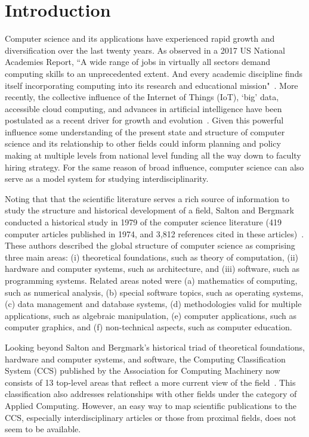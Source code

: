 \section{Introduction}
\label{intro}

Computer science and its applications have experienced rapid growth and diversification over the last twenty years. As observed in a 2017 US National Academies Report, ``A wide range of jobs in virtually all sectors demand computing skills to an unprecedented extent. And every academic discipline finds itself incorporating computing into its research and educational mission"~\cite{nas_2017}. More recently, the collective influence of the Internet of Things (IoT), `big' data, accessible cloud computing, and advances in artificial intelligence have been postulated as a recent driver for growth and evolution~\cite{siebel2019_digital}. Given this powerful influence some understanding of the present state and structure of computer science and its relationship to other fields could inform planning and policy making at multiple levels from national level funding all the way down to faculty hiring strategy. For the same reason of broad influence, computer science can also serve as a model system for studying interdisciplinarity. 

Noting that that the scientific literature serves a rich source of information to study the structure and historical development of a field, 
Salton and Bergmark conducted a historical study  in 1979 of the computer science literature (419 computer articles published in 1974,  and 3,812 references cited in these articles)~\cite{salton_citation_1979}. These authors described the global structure of computer science as comprising three main areas: (i) theoretical foundations, such as theory of computation, (ii) hardware and computer systems, such as architecture,  and (iii) software, such as programming systems.  Related areas noted were (a) mathematics of computing, such as numerical analysis, (b) special software topics, such as operating systems, (c) data management and database systems, (d) methodologies valid for multiple applications, such as algebraic manipulation, (e) computer applications, such as computer graphics, and  (f) non-technical aspects, such as computer education. 

Looking beyond Salton and Bergmark's historical triad of theoretical foundations, hardware and computer systems, and software, the Computing Classification System (CCS) published by the Association for Computing Machinery now consists of 13 top-level areas that reflect a more current view of the field~\cite{acm_ref}. This classification also addresses relationships with other fields under the category of Applied Computing. However, an easy way to map scientific publications to the CCS, especially interdisciplinary articles or those from proximal fields, does not seem to be available. 


